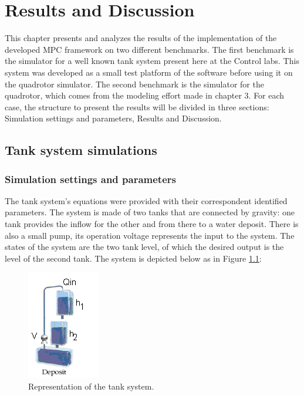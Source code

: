 \chapter{Results and Discussion}
\label{chap:Results_and_Discussion}

This chapter presents and analyzes the results of the implementation of the developed MPC framework on two different benchmarks. The first benchmark is the simulator for a well known tank system present here at the Control labs. This system was developed as a small test platform of the software before using it on the quadrotor simulator. The second benchmark is the simulator for the quadrotor, which comes from the modeling effort made in chapter 3. For each case, the structure to present the results will be divided in three sections: Simulation settings and parameters, Results and Discussion.

\section{Tank system simulations}

\subsection{Simulation settings and parameters}

The tank system's equations were provided with their correspondent identified parameters. The system is made of two tanks that are connected by gravity: one tank provides the inflow for the other and from there to a water deposit. There is also a small pump, its operation voltage represents the input to the system. The states of the system are the two tank level, of which the desired output is the level of the second  tank.  The system is depicted below as in Figure \ref{fig:tank_system}: 

\begin{figure}[H]
\centering
\includegraphics[scale=0.7]{Images/Chapter5/tank_system.png}
\caption{Representation of the tank system.}
\label{fig:tank_system}
\end{figure}

